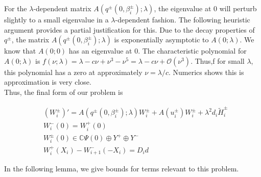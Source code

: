 \documentclass[12pt]{article}
\def\C{{\mathbb C}}
\begin{document}
For the $\lambda$-dependent matrix $A(q^\pm(0, \beta_i^\pm); \lambda)$, the eigenvalue at 0 will perturb slightly to a small eigenvalue in a $\lambda$-dependent fashion. The following heuristic argument provides a partial justification for this. Due to the decay properties of $q^\pm$, the matrix $A(q^\pm(0, \beta_i^\pm); \lambda)$ is exponentially asymptotic to $A(0; \lambda)$. We know that $A(0; 0)$ has an eigenvalue at 0. The characteristic polynomial for $A(0; \lambda)$ is $f(\nu; \lambda) = \lambda - c \nu + \nu^3 - \nu^5 = \lambda - c \nu + \mathcal{O}(\nu^3)$. Thus,f for small $\lambda$, this polynomial has a zero at approximately $\nu = \lambda / c$. Numerics shows this is approximation is very close.\\

Thus, the final form of our problem is

\begin{align}
&(W_i^\pm)' = A(q^\pm(0, \beta_i^\pm); \lambda) W_i^\pm + A(u_i^\pm) W_i^\pm + \lambda^2 d_i \tilde{H}_i^\pm \\
&W_i^-(0) = W_i^+(0) \\
&W_i^\pm(0) \in \C \Psi(0) \oplus Y^+ \oplus Y^- \\
&W_i^+(X_i) - W_{i+1}^-(-X_i) = D_i d
\end{align}

In the following lemma, we give bounds for terms relevant to this problem.

\end{document}
